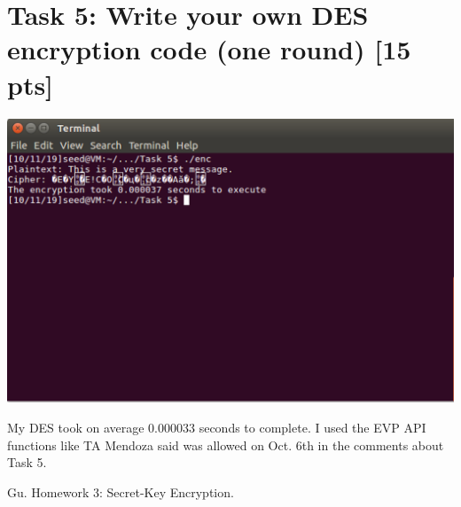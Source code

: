 \documentclass{article}
\begin{document}
\section{Task 5: Write your own DES encryption code (one round) [15 pts]}
\begin{center}
    \includegraphics[scale=0.5]{task5.png}
\end{center}
My DES took on average 0.000033 seconds to complete.  I used the EVP API functions like TA Mendoza said was allowed on Oct. 6th in the comments about Task 5.


\begin{thebibliography}{9}
Gu.
\textmd{Homework 3: Secret-Key Encryption.}
\end{thebibliography}
\end{document}
